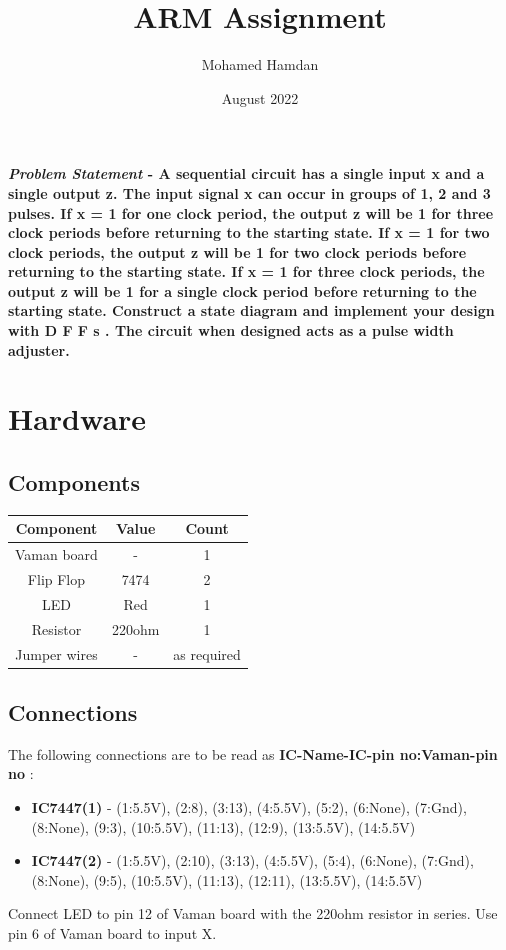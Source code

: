 \documentclass[journal,10pt,twocolumn]{article}
\title{\textbf{ARM Assignment}}
\author{Mohamed Hamdan}
\date{August 2022}
\begin{document}
\maketitle
\paragraph{\textit{Problem Statement} - A sequential circuit has a single input x and a single output z. The input signal x can occur in groups of 1, 2 and 3 pulses. If x = 1 for one clock period, the output z will be 1 for three clock periods before returning to the starting state. If x = 1 for two clock periods, the output z will be 1 for two clock periods before returning to the starting state. If x = 1 for three clock periods, the output z will be 1 for a single clock period before returning to the starting state. Construct a state diagram and implement your design with D F F s . The circuit when designed acts as a pulse width adjuster.
}

\section*{\large Hardware}
\subsection*{\normalsize Components}
{
\centering
\begin{tabular}{|c|c|c|}
\hline
Component&Value&Count\\
\hline
Vaman board&-&1\\
\hline
Flip Flop&7474&2\\
\hline
LED&Red&1\\
\hline
Resistor&220ohm&1\\
\hline
Jumper wires&-&as required\\
\hline
\end{tabular}\par
}
\subsection*{\normalsize Connections}
The following connections are to be read as \textbf{IC-Name-IC-pin no:Vaman-pin no} :
\begin{itemize}
\item \textbf{IC7447(1)} - (1:5.5V), (2:8), (3:13), (4:5.5V), (5:2), (6:None), (7:Gnd), (8:None), (9:3), (10:5.5V), (11:13), (12:9), (13:5.5V), (14:5.5V)
\item \textbf{IC7447(2)} - (1:5.5V), (2:10), (3:13), (4:5.5V), (5:4), (6:None), (7:Gnd), (8:None), (9:5), (10:5.5V), (11:13), (12:11), (13:5.5V), 
 (14:5.5V)
\end{itemize}
Connect LED to pin 12 of Vaman board with the 220ohm resistor in series. Use pin 6 of Vaman board to input X.
\end{document}

